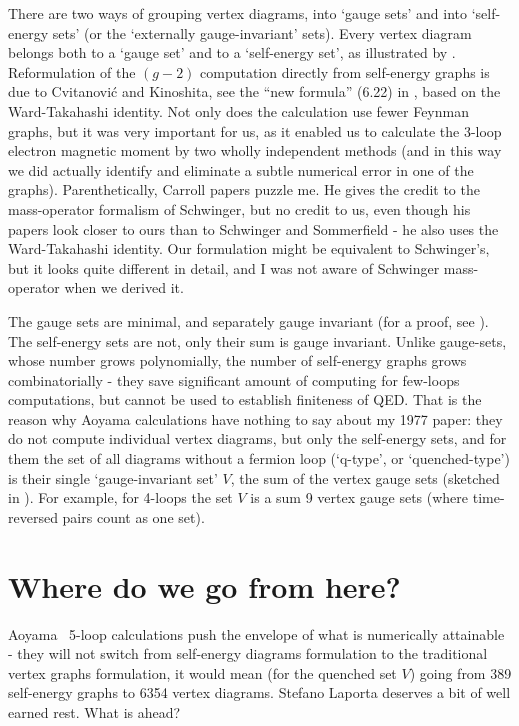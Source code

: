 There are two ways of grouping vertex diagrams, into `gauge sets' and
into `self-energy sets' (or the `externally gauge-invariant' sets). Every
vertex diagram belongs both to a `gauge set' and to a `self-energy set',
as illustrated by .
Reformulation of the $(g-2)$ computation directly from self-energy graphs is due to
{Cvitanovi\'{c} and Kinoshita},
see the ``new formula'' (6.22) in , based on the
Ward-Takahashi identity. Not only does the calculation use fewer Feynman
graphs, but it was very important for us, as it enabled us to calculate
the 3-loop electron magnetic moment by two wholly independent methods
(and in this way we did actually identify and eliminate a subtle
numerical error in one of the graphs).
Parenthetically, Carroll papers puzzle me. He
gives the credit to the mass-operator formalism of
Schwinger, but no credit to
us, even though his papers look closer to ours than to
Schwinger and Sommerfield - he also uses the Ward-Takahashi identity. Our
formulation might be equivalent to Schwinger's, but it looks quite
different in detail, and I was not aware of Schwinger mass-operator when
we derived it.

The gauge sets are minimal, and separately gauge invariant (for a proof,
see ). The self-energy sets are not, only their sum is
gauge invariant.
Unlike gauge-sets, whose number grows polynomially, the number of
self-energy graphs grows combinatorially - they save significant amount
of computing for few-loops computations, but cannot be used to establish
finiteness of QED.
That is the reason why Aoyama \etal{}
calculations have nothing to
say about my 1977 paper: they do not compute individual
vertex diagrams, but only the self-energy sets, and for them the set of
all diagrams without a fermion loop (`q-type', or `quenched-type') is their single
`gauge-invariant set'  $V$,  the sum of the vertex
gauge sets (sketched in ). For
example, for 4-loops the set $V$ is a sum 9 vertex gauge
sets (where time-reversed pairs count as one set).

\section{Where do we go from here?}
\label{sect:future}

Aoyama \etal\ 5-loop calculations push the envelope of what is
numerically attainable - they will not switch from self-energy diagrams
formulation to the traditional vertex graphs formulation, it would mean
(for the quenched set $V$) going from 389 self-energy graphs to 6354
vertex diagrams. Stefano Laporta deserves a bit of well earned rest.
What is ahead?

